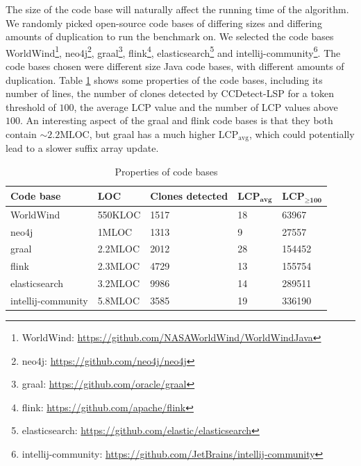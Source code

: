 The size of the code base will naturally affect the running time of the algorithm. We
randomly picked open-source code bases of differing sizes and differing amounts of
duplication to run the benchmark on. We selected the code bases
WorldWind\footnote{WorldWind: \url{https://github.com/NASAWorldWind/WorldWindJava}}, neo4j\footnote{neo4j:
\url{https://github.com/neo4j/neo4j}}, graal\footnote{graal:
\url{https://github.com/oracle/graal}}, flink\footnote{flink:
\url{https://github.com/apache/flink}}, elasticsearch\footnote{elasticsearch:
\url{https://github.com/elastic/elasticsearch}} and
intellij-community\footnote{intellij-community:
\url{https://github.com/JetBrains/intellij-community}}. The code bases chosen were
different size Java code bases, with different amounts of duplication. Table
\ref{tab:codebases} shows some properties of the code bases, including its number of
lines, the number of clones detected by CCDetect-LSP for a token threshold of $100$, the
average LCP value and the number of LCP values above $100$. An interesting aspect of the
graal and flink code bases is that they both contain $\sim2.2\text{MLOC}$, but graal has a
much higher $\text{LCP}_\text{avg}$, which could potentially lead to a slower suffix array
update.

\begin{table}[t]
    \begin{center}
        \begin{tabular}[c]{|l|l|l|l|l|}
            \hline
            \textbf{Code base} & \textbf{LOC} & \textbf{Clones detected} &
            $\textbf{LCP}_{\textbf{avg}}$ & $\textbf{LCP}_{\geq \textbf{100}}$ \\
            \hline
            WorldWind & 550KLOC & 1517 & 18 & 63967\\
            \hline
            neo4j & 1MLOC & 1313 & 9 & 27557\\
            \hline
            graal & 2.2MLOC & 2012 & 28 & 154452\\
            \hline
            flink & 2.3MLOC & 4729 & 13 & 155754\\
            \hline
            elasticsearch & 3.2MLOC & 9986 & 14 & 289511 \\
            \hline
            intellij-community & 5.8MLOC & 3585 & 19 & 336190 \\
            \hline
        \end{tabular}
    \end{center}
    \caption{Properties of code bases}
    \label{tab:codebases}
\end{table}

